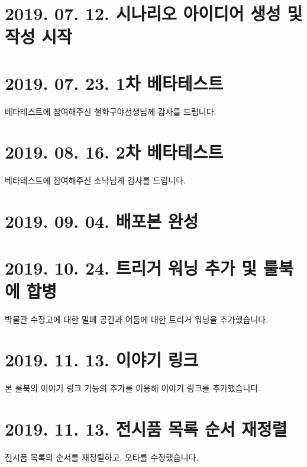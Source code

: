 \documentclass{report}
\begin{document}
	\section*{2019. 07. 12. 시나리오 아이디어 생성 및 작성 시작}
	
	\section*{2019. 07. 23. 1차 베타테스트}
	베타테스트에 참여해주신 철화구야선생님께 감사를 드립니다.
	
	\section*{2019. 08. 16. 2차 베타테스트}
	베타테스트에 참여해주신 소낙님게 감사를 드립니다.
	
	\section*{2019. 09. 04. 배포본 완성}
	
	\section*{2019. 10. 24. 트리거 워닝 추가 및 룰북에 합병}
	박물관 수장고에 대한 밀폐 공간과 어둠에 대한 트리거 워닝을 추가했습니다.
	
	\section*{2019. 11. 13. 이야기 링크}
	본 룰북의 이야기 링크 기능의 추가를 이용해 이야기 링크를 추가했습니다.

	\section*{2019. 11. 13. 전시품 목록 순서 재정렬}
	전시품 목록의 순서를 재정렬하고, 오타를 수정했습니다.
\end{document}
